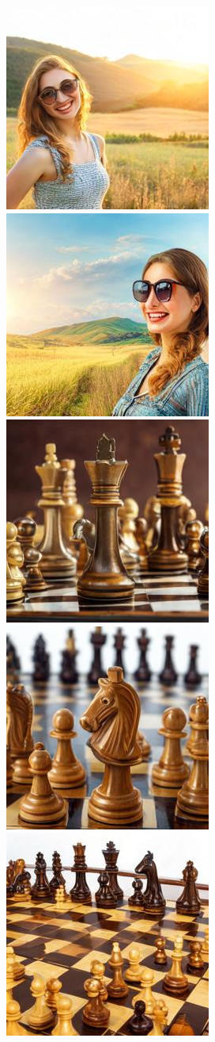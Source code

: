 \documentclass[]{fairmeta}
\begin{document}
\begin{figure}[b!]
\begin{subfigure}[t]{0.495\linewidth}
        \includegraphics[width=0.32\linewidth]{figs/samples/adjmat_prompt_72_image_1.jpg}\;%
        \includegraphics[width=0.32\linewidth]{figs/samples/adjmat_prompt_72_image_6.jpg}\\
        \includegraphics[width=0.32\linewidth]{figs/samples/adjmat_prompt_75_image_0.jpg}\;%
        \includegraphics[width=0.32\linewidth]{figs/samples/adjmat_prompt_75_image_3.jpg}\;%
        \includegraphics[width=0.32\linewidth]{figs/samples/adjmat_prompt_75_image_9.jpg}

\end{subfigure}
\end{figure}
\end{document}
